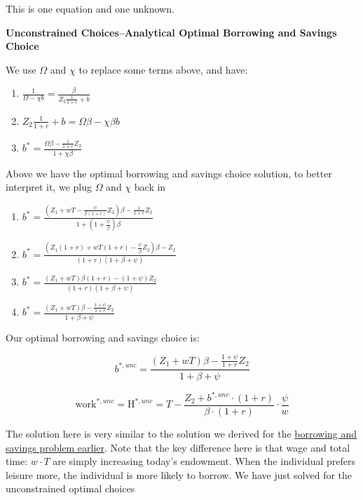 \documentclass[
]{book}
\begin{document}
This is one equation and one unknown.

\textbf{Unconstrained Choices--Analytical Optimal Borrowing and Savings
Choice}

We use \(\Omega\) and \(\chi\) to replace some terms above, and have:

\begin{enumerate}
\def\labelenumi{\arabic{enumi}.}
\item
  \(\displaystyle \frac{1}{\Omega -\chi b}=\frac{\beta }{Z_2 \frac{1}{1+r}+b}\)
\item
  \(\displaystyle Z_2 \frac{1}{1+r}+b=\Omega \beta -\chi \beta b\)
\item
  \(\displaystyle b^{\ast } =\frac{\Omega \beta -\frac{1}{1+r}Z_2 }{1+\chi \beta }\)
\end{enumerate}

Above we have the optimal borrowing and savings choice solution, to
better interpret it, we plug \(\Omega\) and \(\chi\) back in

\begin{enumerate}
\def\labelenumi{\arabic{enumi}.}
\item
  \(\displaystyle b^{\ast } =\frac{\left(Z_1 +wT-\frac{\psi }{\beta (1+r)}Z_2 \right)\beta -\frac{1}{1+r}Z_2 }{1+\left(1+\frac{\psi }{\beta }\right)\beta }\)
\item
  \(\displaystyle b^{\ast } =\frac{\left(Z_1 (1+r)+wT(1+r)-\frac{\psi }{\beta }Z_2 \right)\beta -Z_2 }{\left(1+r\right)\left(1+\beta +\psi \right)}\)
\item
  \(\displaystyle b^{\ast } =\frac{\left(Z_1 +wT\right)\beta (1+r)-\left(1+\psi \right)Z_2 }{\left(1+r\right)\left(1+\beta +\psi \right)}\)
\item
  \(\displaystyle b^{\ast } =\frac{\left(Z_1 +wT\right)\beta -\frac{1+\psi }{1+r}Z_2 }{1+\beta +\psi }\)
\end{enumerate}

Our optimal borrowing and savings choice is:

\[b^{\ast ,unc} =\frac{\left(Z_1 +wT\right)\beta -\frac{1+\psi }{1+r}Z_2 }{1+\beta +\psi }\]

\[{\textrm{work}}^{\ast ,unc} ={\textrm{H}}^{\ast ,unc} =T-\frac{Z_2 +b^{\ast ,unc} \cdot (1+r)}{\beta \cdot (1+r)}\cdot \frac{\psi }{w}\]

The solution here is very similar to the solution we derived for the
\href{https://fanwangecon.github.io/Math4Econ/optimization_application/household_c1_c2_constrained.html}{borrowing and savings problem
earlier}.
Note that the key difference here is that wage and total time:
\(w\cdot T\) are simply increasing today's endowment. When the individual
prefers leisure more, the individual is more likely to borrow. We have
just solved for the unconstrained optimal choices
\end{document}
